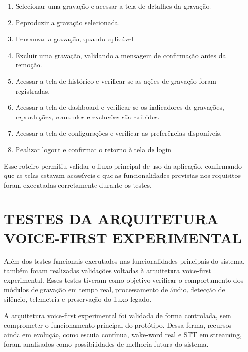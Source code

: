\documentclass[12pt,oneside,a4paper,brazil,final]{abntex2}
\begin{document}
\begin{enumerate}
    \item Selecionar uma gravação e acessar a tela de detalhes da gravação.

    \item Reproduzir a gravação selecionada.

    \item Renomear a gravação, quando aplicável.

    \item Excluir uma gravação, validando a mensagem de confirmação antes da remoção.

    \item Acessar a tela de histórico e verificar se as ações de gravação foram registradas.

    \item Acessar a tela de dashboard e verificar se os indicadores de gravações, reproduções, comandos e exclusões são exibidos.

    \item Acessar a tela de configurações e verificar as preferências disponíveis.

    \item Realizar logout e confirmar o retorno à tela de login.

\end{enumerate}

Esse roteiro permitiu validar o fluxo principal de uso da aplicação, confirmando que as telas estavam acessíveis e que as funcionalidades previstas nos requisitos foram executadas corretamente durante os testes.


\clearpage

\section{TESTES DA ARQUITETURA VOICE-FIRST EXPERIMENTAL}

Além dos testes funcionais executados nas funcionalidades principais do sistema, também foram realizadas validações voltadas à arquitetura voice-first experimental. Esses testes tiveram como objetivo verificar o comportamento dos módulos de gravação em tempo real, processamento de áudio, detecção de silêncio, telemetria e preservação do fluxo legado.

A arquitetura voice-first experimental foi validada de forma controlada, sem comprometer o funcionamento principal do protótipo. Dessa forma, recursos ainda em evolução, como escuta contínua, wake-word real e STT em streaming, foram analisados como possibilidades de melhoria futura do sistema.
\end{document}
